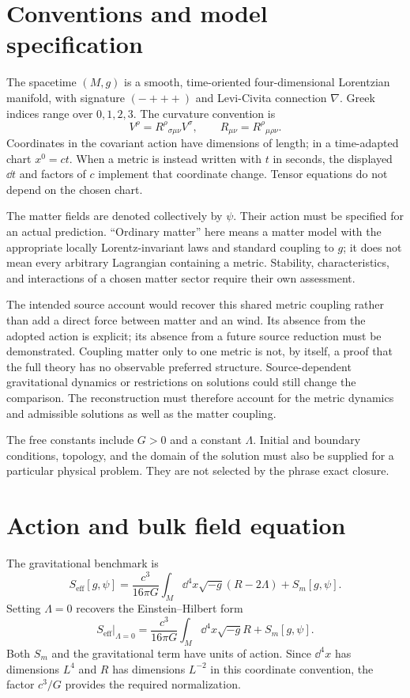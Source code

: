 \documentclass[11pt]{article}
\begin{document}
\section{Conventions and model specification}
The spacetime $(M,g)$ is a smooth, time-oriented four-dimensional Lorentzian manifold, with signature $(-+++)$ and Levi-Civita connection $\nabla$. Greek indices range over $0,1,2,3$. The curvature convention is
\begin{equation}
[\nabla_\mu,\nabla_\nu]V^\rho=R^\rho{}_{\sigma\mu\nu}V^\sigma,
\qquad R_{\mu\nu}=R^\rho{}_{\mu\rho\nu}.
\end{equation}
Coordinates in the covariant action have dimensions of length; in a time-adapted chart $x^0=ct$. When a metric is instead written with $t$ in seconds, the displayed $\dd t$ and factors of $c$ implement that coordinate change. Tensor equations do not depend on the chosen chart.

The matter fields are denoted collectively by $\psi$. Their action must be specified for an actual prediction. ``Ordinary matter'' here means a matter model with the appropriate locally Lorentz-invariant laws and standard coupling to $g$; it does not mean every arbitrary Lagrangian containing a metric. Stability, characteristics, and interactions of a chosen matter sector require their own assessment.

The intended source account would recover this shared metric coupling rather than add a direct force between matter and an \Aflow{} wind. Its absence from the adopted action is explicit; its absence from a future source reduction must be demonstrated. Coupling matter only to one metric is not, by itself, a proof that the full theory has no observable preferred structure. Source-dependent gravitational dynamics or restrictions on solutions could still change the comparison. The reconstruction must therefore account for the metric dynamics and admissible solutions as well as the matter coupling.

The free constants include $G>0$ and a constant $\Lambda$. Initial and boundary conditions, topology, and the domain of the solution must also be supplied for a particular physical problem. They are not selected by the phrase exact closure.

\section{Action and bulk field equation}
The gravitational benchmark is
\begin{equation}
S_{\mathrm{eff}}[g,\psi]=\frac{c^3}{16\pi G}
\int_M\dd^4x\sqrt{-g}(R-2\Lambda)+S_m[g,\psi].
\label{eq:SA_lambda}
\end{equation}
Setting $\Lambda=0$ recovers the Einstein--Hilbert form
\begin{equation}
S_{\mathrm{eff}}\big|_{\Lambda=0}
=\frac{c^3}{16\pi G}\int_M\dd^4x\sqrt{-g}R+S_m[g,\psi].
\label{eq:SA}
\end{equation}
Both $S_m$ and the gravitational term have units of action. Since $\dd^4x$ has dimensions $L^4$ and $R$ has dimensions $L^{-2}$ in this coordinate convention, the factor $c^3/G$ provides the required normalization.
\end{document}
